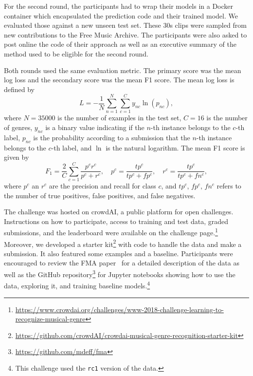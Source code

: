 \documentclass[sigconf]{acmart}
\begin{document}
For the second round, the participants had to wrap their models in a Docker container which encapsulated the prediction code and their trained model.
We evaluated those against a new unseen test set. These 30s clips were sampled from new contributions to the Free Music Archive.
The participants were also asked to post online the code of their approach as well as an executive summary of the method used to be eligible for the second round.

Both rounds used the same evaluation metric. The primary score was the mean log loss and the secondary score was the mean F1 score.
The mean log loss is defined by
\begin{equation}
	L = - \frac{1}{N} \sum_{n=1}^N \sum_{c=1}^{C} y_{nc} \ln(p_{nc}),
\end{equation}
where $N=35000$ is the number of examples in the test set,
$C=16$ is the number of genres,
$y_{nc}$ is a binary value indicating if the $n$-th instance belongs to the $c$-th label,
$p_{nc}$ is the probability according to a submission that the $n$-th instance belongs to the $c$-th label,
and $\ln$ is the natural logarithm.
The mean F1 score is given by
\begin{equation}
	F_1 = \frac{2}{C} \sum_{c=1}^{C} \frac{p^c r^c}{p^c + r^c}, \hspace{1em}
	p^c = \frac{tp^c}{tp^c + fp^c}, \hspace{1em}
	r^c = \frac{tp^c}{tp^c + fn^c},
\end{equation}
where $p^c$ an $r^c$ are the precision and recall for class $c$, and $tp^c$, $fp^c$, $fn^c$ refers to the number of true positives, false positives, and false negatives.

The challenge was hosted on crowdAI, a public platform for open challenges. Instructions on how to participate, access to training and test data, graded submissions, and the leaderboard were available on the challenge page.\footnote{\url{https://www.crowdai.org/challenges/www-2018-challenge-learning-to-recognize-musical-genre}}
Moreover, we developed a starter kit\footnote{\url{https://github.com/crowdAI/crowdai-musical-genre-recognition-starter-kit}} with code to handle the data and make a submission. It also featured some examples and a baseline.
Participants were encouraged to review the FMA paper~\cite{fma_dataset} for a detailed description of the data as well as the GitHub repository\footnote{\url{https://github.com/mdeff/fma}} for Jupyter notebooks showing how to use the data, exploring it, and training baseline models.\footnote{This challenge used the \texttt{rc1} version of the data.}
\end{document}
